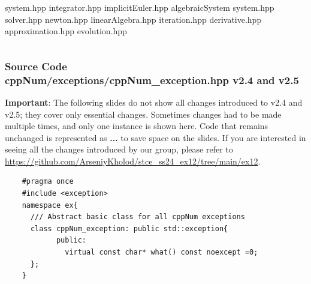 \documentclass[ucs,10pt]{beamer}
\begin{document}
\begin{frame}
\begin{columns}
\begin{column}{0.5\textwidth}
               		    \indent \indent system.hpp \newline
                 	    \indent \indent integrator.hpp \newline
                 	    \indent \indent implicitEuler.hpp \newline
                 	  \indent algebraicSystem \newline
                 	    \indent \indent system.hpp \newline
                 	    \indent \indent solver.hpp \newline
                  	    \indent \indent newton.hpp \newline
                 	  \indent linearAlgebra.hpp \newline
               	 	  \indent iteration.hpp \newline
                 	  \indent derivative.hpp \newline
                 	  \indent approximation.hpp \newline
		 	  \indent evolution.hpp \newline
     		\end{column}
	\end{columns}
\end{frame}

\begin{frame}[fragile]
\frametitle{Source Code \\
        \small \color{rwth-blue} cppNum/exceptions/cppNum\_exception.hpp v2.4 and v2.5 }
	\textbf{Important}: The following slides do not show all changes introduced to v2.4 and v2.5; they cover only essential changes. Sometimes changes had to be made multiple times, and only one instance is shown here. Code that remains unchanged is represented as \textbf{...} to save space on the slides. If you are interested in seeing all the changes introduced by our group, please refer to  \url{https://github.com/ArseniyKholod/stce_ss24_ex12/tree/main/ex12}. 
	\begin{lstlisting}
	#pragma once
	#include <exception>
	namespace ex{
  	  /// Abstract basic class for all cppNum exceptions
  	  class cppNum_exception: public std::exception{
    	    public:
    	      virtual const char* what() const noexcept =0;
  	  };
	}
	\end{lstlisting}
\end{frame}
\end{document}
